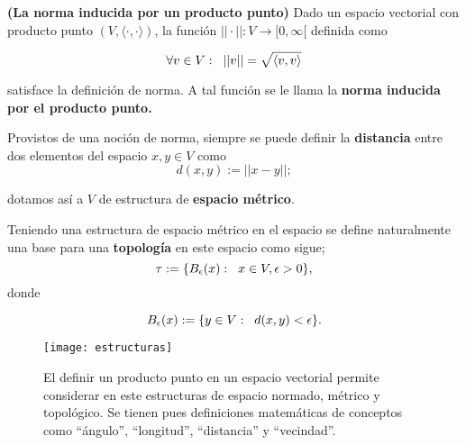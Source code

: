 \begin{prop}
\label{prop: La norma inducida por un producto punto}
\textbf{(La norma inducida por un producto punto)}
Dado un espacio vectorial con
producto punto $(V, \langle \cdot , \cdot \rangle )$, 
la función $|| \cdot || : V \longrightarrow [0, \infty[$ definida como

\begin{equation}
\label{eq: norma via producto punto}
\forall v \in V: \hspace{0.2cm} || v || = \sqrt{\langle v,v \rangle}
\end{equation}

\noindent
satisface la definición de norma. A tal función se le llama
la \textbf{norma inducida por el producto punto.}
\end{prop}

Provistos de una noción de norma, siempre se puede definir
la \textbf{distancia} entre dos elementos del espacio
$x, y \in V$ como 
\begin{equation}
\label{eq: distancia a partir de norma}
d(x, y) := ||x-y||;
\end{equation}

\noindent
dotamos así a $V$ de estructura de \textbf{espacio métrico}.

Teniendo una estructura de espacio métrico en el espacio se 
define naturalmente una base para una \textbf{topología} en este espacio como sigue;
\begin{equation}
\label{eq: top espacio con producto punto}
\tau := \{ B_{\epsilon}(x) : \hspace{0.2cm} x \in V, \epsilon >0 \},
\end{equation}
donde 

\[
B_{\epsilon}(x) := \{ y \in V : \hspace{0.2cm} d(x,y) < \epsilon \}.
\]


\begin{figure}[H]
\centering\captionsetup{format = hang}
	\begin{measuredfigure}
		\texttt{[image: estructuras]} 
		\caption{El definir un producto punto en un espacio
		vectorial permite considerar en este estructuras de espacio normado,
		métrico y topológico. Se tienen pues definiciones
		matemáticas de conceptos como ``ángulo'', ``longitud'',
		``distancia'' y ``vecindad''.}
 	\end{measuredfigure}
 \end{figure}


